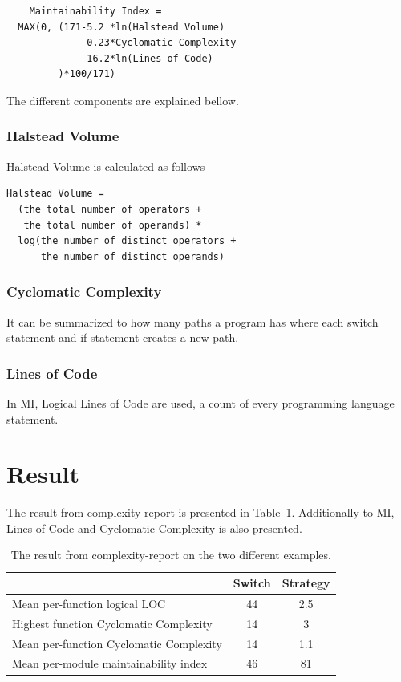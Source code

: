 \documentclass[conference, a4paper]{IEEEtran}
\begin{document}
\begin{verbatim}
	Maintainability Index =
  MAX(0, (171-5.2 *ln(Halstead Volume)
             -0.23*Cyclomatic Complexity
             -16.2*ln(Lines of Code)
         )*100/171)
\end{verbatim}
The different components are explained bellow.

\subsubsection{Halstead Volume}
Halstead Volume is calculated as follows
\begin{verbatim}
Halstead Volume =
  (the total number of operators +
   the total number of operands) *
  log(the number of distinct operators +
      the number of distinct operands)
\end{verbatim}
\subsubsection{Cyclomatic Complexity}
It can be summarized to how many paths a program has where each switch statement and if statement creates a new path.

\subsubsection{Lines of Code}
In MI, Logical Lines of Code are used, a count of every programming language statement.

\section{Result}
The result from complexity-report is presented in Table~\ref{fig:result}. Additionally to MI, Lines of Code and Cyclomatic Complexity is also presented.

\begin{table}[ht]
	\centering
	\begin{tabular}{ |l|c|c| }
		\hline
		                                        & Switch & Strategy \\\hline
		Mean per-function logical LOC           & 44     & 2.5      \\\hline
		Highest function Cyclomatic Complexity  & 14     & 3        \\\hline
		Mean per-function Cyclomatic Complexity & 14     & 1.1      \\\hline
		Mean per-module maintainability index   & 46     & 81       \\
		\hline
	\end{tabular}
	\small
	\caption{The result from complexity-report on the two different examples.}
	\label{fig:result}
\end{table}
\end{document}
